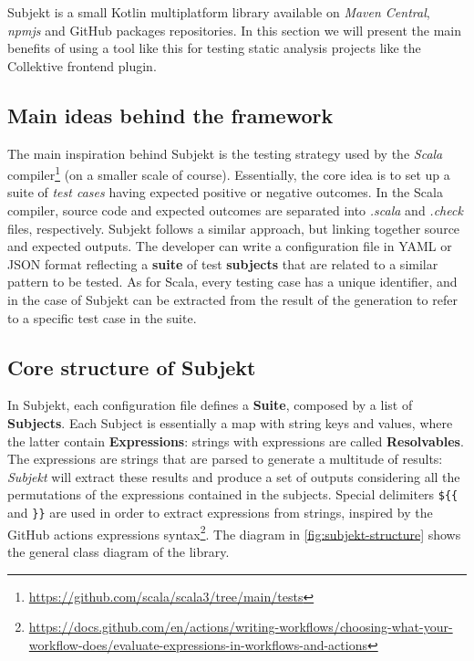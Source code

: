 \documentclass[12pt,a4paper,openright,twoside]{book}
\begin{document}
Subjekt is a small Kotlin multiplatform library available on \emph{Maven
Central}, \emph{npmjs} and GitHub packages repositories. In this section we will
present the main benefits of using a tool like this for testing static analysis
projects like the Collektive frontend plugin.

\subsection{Main ideas behind the framework}

The main inspiration behind Subjekt is the testing strategy used by the
\emph{Scala}
compiler\footnote{\url{https://github.com/scala/scala3/tree/main/tests}} (on
a smaller scale of course).
% 
Essentially, the core idea is to set up a suite of \emph{test cases} having
expected positive or negative outcomes. In the Scala compiler, source code and
expected outcomes are separated into \emph{.scala} and \emph{.check} files,
respectively. 
%
Subjekt follows a similar approach, but linking together source and expected
outputs. The developer can write a configuration file in YAML or JSON format
reflecting a \textbf{suite} of test \textbf{subjects} that are related to 
a similar pattern to be tested. 
%
As for Scala, every testing case has a unique identifier, and in the case of
Subjekt can be extracted from the result of the generation to refer to a 
specific test case in the suite.

\subsection{Core structure of Subjekt}

In Subjekt, each configuration file defines a \textbf{Suite}, composed by a list
of \textbf{Subjects}. Each Subject is essentially a map with string keys and
values, where the latter contain \textbf{Expressions}: strings with expressions
are called \textbf{Resolvables}. 
%
The expressions are strings that are parsed to generate a multitude of results:
\emph{Subjekt} will extract these results and produce a set of outputs
considering all the permutations of the expressions contained in the subjects.
Special delimiters \lstinline|${{| and \lstinline|}}| are used in order to
extract expressions from strings, inspired by the GitHub actions expressions
syntax\footnote{
\url{https://docs.github.com/en/actions/writing-workflows/choosing-what-your-workflow-does/evaluate-expressions-in-workflows-and-actions}
}.
%
The diagram in \cref{fig:subjekt-structure} shows the general class diagram of 
the library.
\end{document}
